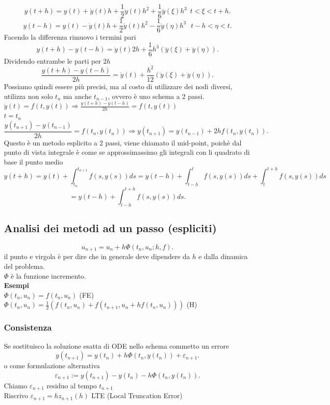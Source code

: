 \documentclass[12px]{article}
\begin{document}
	\[
	y(t+h) = y(t) + \dot y(t)h + \frac 12 \ddot y(t)h^2 + \frac 16 \dddot y(\xi)h^3\ \ t < \xi < t + h
	.\] 
	\[
	y(t-h) = y(t) - \dot y(t)h + \frac 12 \ddot y(t)h^2  - \frac 16\dddot y(\eta)h^3\ \ \ t-h < \eta < t 
	.\] 
	Facendo la differenza rimuovo i termini pari
	\[
	y(t+h) - y(t-h) = \dot y(t)2h + \frac 16 h^3(\dddot y(\xi) + \dddot y(\eta))
	.\] 
	Dividendo entrambe le parti per $2h$
	 \[
		 \frac{y(t+h)-y(t-h)}{2h} = \dot y(t) + \frac{h^2}{12}(\dddot y(\xi) + \dddot y(\eta))
	.\] 
	Possiamo quindi essere più precisi, ma al costo di utilizzare dei nodi diversi, utilizza non solo $t_{n}$ ma anche  $t_{n-1}$, ovvero è uno schema a 2 passi.\\
	$\dot y(t) = f(t,y(t)) \Rightarrow  \frac{y(t+h) - y(t-h)}{2h} = f(t,y(t))$ \\
	$t=t_n$
	 \[
		 \frac{y(t_{n+1}) - y(t_{n-1})}{2h} = f(t_{n},y(t_{n})) \Rightarrow  y(t_{n+1}) = y(t_{n-1}) + 2h f(t_n,y(t_n))
	.\] 
	Questo è un metodo esplicito a 2 passi, viene chiamato il mid-point, poichè dal punto di vista integrale è come se approssimassimo gli integrali con li quadrato di base il punto medio\\
	\[
		y(t+h) = y(t) + \int_{t_n}^{t_{n+1}}f(s,y(s))ds = y(t-h) + \int_{t-h}^tf(s,y(s))ds + \int_t^{t+h}f(s,y(s))ds
	\] \[
	= y(t-h) + \int_{t-h}^{t+h}f(s,y(s))ds
	.\] 
	\subsection{Analisi dei metodi ad un passo (espliciti)}
\[
	u_{n+1} = u_n + h\Phi(t_n,u_n; h, f)
.\] 
il punto e virgola è per dire che in generale deve dipendere da $h$ e dalla dinamica del problema.\\
$\Phi$ è la funzione incremento.\\
 \textbf{Esempi}\\
 $\Phi(t_n,u_n) = f(t_n,u_n)$ \hfill  (FE)\\
 $\Phi(t_n,u_n) = \frac 12 (f(t_n,u_n) + f(t_{n+1},u_n + hf(t_n,u_n)))$ \hfill (H)
 \subsubsection{Consistenza}
Se sostituisco la soluzione esatta di ODE nello schema commetto un errore
\[
	y(t_{n+1}) = y(t_n) + h\Phi(t_n,y(t_n))+ \varepsilon_{n+1}
.\] 
o come formulazione alternativa
\[
	\varepsilon_{n+1}:= y(t_{n+1})-y(t_n) -h \Phi(t_n,y(t_n))
.\] 
Chiamo $\varepsilon_{n+1}$ residuo al tempo  $t_{n+1}$\\
Riscrivo $\varepsilon_{n+1} = hz_{n+1}(h)$ LTE (Local Truncation Error)
\end{document}
